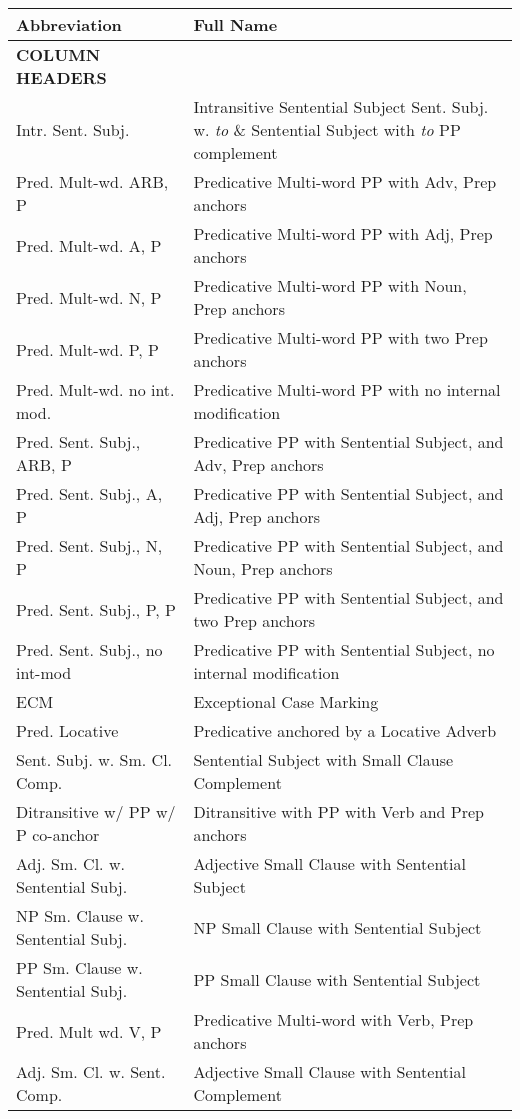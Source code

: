 \footnotesize
\begin{tabular}{ll}
Abbreviation&Full Name\\
\hline
{\bf COLUMN HEADERS} &\\
\hline
Intr. Sent. Subj. & Intransitive Sentential Subject
Sent. Subj. w. {\it to} \& Sentential Subject with {\it to} PP complement \\
Pred. Mult-wd. ARB, P & Predicative Multi-word PP with Adv, Prep anchors\\
Pred. Mult-wd. A, P & Predicative Multi-word PP with Adj, Prep anchors\\
Pred. Mult-wd. N, P & Predicative Multi-word PP with Noun, Prep
anchors\\
Pred. Mult-wd. P, P & Predicative Multi-word PP with two Prep
anchors\\
Pred. Mult-wd. no int. mod. & Predicative Multi-word PP with no internal
modification\\
Pred. Sent. Subj., ARB, P & Predicative PP with Sentential Subject, and
Adv, Prep anchors\\
Pred. Sent. Subj., A, P & Predicative PP with Sentential Subject, and
Adj, Prep anchors\\
Pred. Sent. Subj., N, P & Predicative PP with Sentential Subject, and
Noun, Prep anchors\\
Pred. Sent. Subj., P, P & Predicative PP with Sentential Subject, and two
Prep anchors\\
Pred. Sent. Subj., no int-mod & Predicative PP with Sentential Subject,
no internal modification\\
ECM & Exceptional Case Marking\\
Pred. Locative & Predicative anchored by a Locative Adverb\\
Sent. Subj. w. Sm. Cl. Comp. & Sentential Subject with Small Clause
Complement\\
Ditransitive w/ PP w/ P co-anchor & Ditransitive with PP with Verb and Prep
anchors\\
Adj. Sm. Cl. w. Sentential Subj. & Adjective Small Clause with Sentential Subject\\
NP Sm. Clause w. Sentential Subj. & NP Small Clause with Sentential Subject\\
PP Sm. Clause w. Sentential Subj. & PP Small Clause with Sentential Subject\\
Pred. Mult wd. V, P & Predicative Multi-word with Verb, Prep anchors \\
Adj. Sm. Cl. w. Sent. Comp.&Adjective Small Clause with Sentential
Complement\\

\end{tabular}

